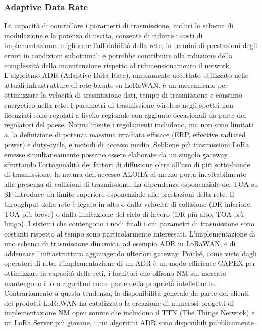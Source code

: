 \documentclass[a4paper]{report} %
\begin{document}
\subsubsection{Adaptive Data Rate}
La capacità di controllare i parametri di trasmissione, inclusi lo schema di modulazione e la potenza di uscita, consente di ridurre i costi di implementazione, migliorare l'affidabilità della rete, in termini di prestazioni degli errori in condizioni subottimali e potrebbe contribuire alla riduzione della complessità della manutenzione rispetto al ridimensionamento il network. L'algoritmo ADR (Adaptive Data Rate), ampiamente accettato utilizzato nelle attuali infrastrutture di rete basate su LoRaWAN, è un meccanismo per ottimizzare la velocità di trasmissione dati, tempo di trasmissione e consumo energetico nella rete. 
I parametri di trasmissione wireless negli spettri non licenziati sono regolati a livello regionale con aggiunte occasionali da parte dei regolatori del paese. Normalmente i regolamenti includono, ma non sono limitati a, la definizione di potenza massima irradiata efficace (ERP, effective radiated power) e duty-cycle, e metodi di accesso medio. Sebbene più trasmissioni LoRa emesse simultaneamente possano essere elaborate da un singolo gateway sfruttando l'ortogonalità dei fattori di diffusione oltre all'uso di più sotto-bande di trasmissione, la natura dell'accesso ALOHA al mezzo porta inevitabilmente alla presenza di collisioni di trasmissione. La dipendenza esponenziale del TOA su SF introduce un limite superiore esponenziale alle prestazioni della rete. Il throughput della rete è legato in alto o dalla velocità di collisione (DR inferiore, TOA più breve) o dalla limitazione del ciclo di lavoro (DR più alto, TOA più lungo). I sistemi che contengono i nodi finali i cui parametri di trasmissione sono costanti rispetto al tempo sono particolarmente interessati. L'implementazione di uno schema di trasmissione dinamica, ad esempio ADR in LoRaWAN, e di addensare l'infrastruttura aggiungendo ulteriori gateway. Poiché, come visto dagli operatori di rete, l'implementazione di un ADR è un modo efficiente CAPEX per ottimizzare la capacità delle reti, i fornitori che offrono NM sul mercato mantengono i loro algoritmi come parte della proprietà intellettuale. Contrariamente a questa tendenza, la disponibilità generale da parte dei clienti dei prodotti LoRaWAN ha catalizzato la creazione di numerosi progetti di implementazione NM open source che includono il TTN (The Things Network) e un LoRa Server più giovane, i cui algoritmi ADR sono disponibili pubblicamente \cite{art:rif.48}.
\end{document}
